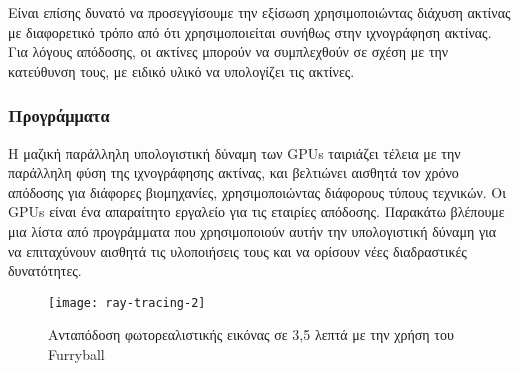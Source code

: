 Είναι επίσης δυνατό να προσεγγίσουμε την εξίσωση χρησιμοποιώντας διάχυση ακτίνας με διαφορετικό τρόπο από ότι χρησιμοποιείται συνήθως στην ιχνογράφηση ακτίνας. Για λόγους απόδοσης, οι ακτίνες μπορούν να συμπλεχθούν σε σχέση με την κατεύθυνση τους, με ειδικό υλικό να υπολογίζει τις ακτίνες.

\subsubsection{Προγράμματα}
Η μαζική παράλληλη υπολογιστική δύναμη των GPUs ταιριάζει τέλεια με την παράλληλη φύση της ιχνογράφησης ακτίνας, και βελτιώνει αισθητά τον χρόνο απόδοσης για διάφορες βιομηχανίες, χρησιμοποιώντας διάφορους τύπους τεχνικών. Οι GPUs είναι ένα απαραίτητο εργαλείο για τις εταιρίες απόδοσης. Παρακάτω βλέπουμε μια λίστα από προγράμματα που χρησιμοποιούν αυτήν την υπολογιστική δύναμη για να επιταχύνουν αισθητά τις υλοποιήσεις τους και να ορίσουν νέες διαδραστικές δυνατότητες.

\begin{figure}[h]
\centering
\texttt{[image: ray-tracing-2]}
\caption{Ανταπόδοση φωτορεαλιστικής εικόνας σε 3,5 λεπτά με την χρήση του Furryball}
\end{figure}


